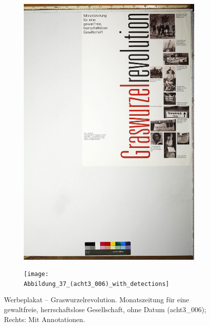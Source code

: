 \documentclass[a4paper,12pt,ngerman]{article}
\begin{document}
\newpage
\begin{landscape}
\begin{figure}[ht]
	\begin{subfigure}[b]{0.5\linewidth}
	\centering
	\includegraphics[height=\linewidth]{Abbildung_41_(acht3_006)}
	\end{subfigure}
	\begin{subfigure}[b]{0.5\linewidth}
	\centering
	\texttt{[image: Abbildung\_37\_(acht3\_006)\_with\_detections]}
	\end{subfigure}
	\caption{Werbeplakat – Graswurzelrevolution. Monatszeitung für eine gewaltfreie, herrschaftslose Gesellschaft, ohne Datum (acht3\_006); Rechts: Mit Annotationen.}
\end{figure}
\end{landscape}
\end{document}
